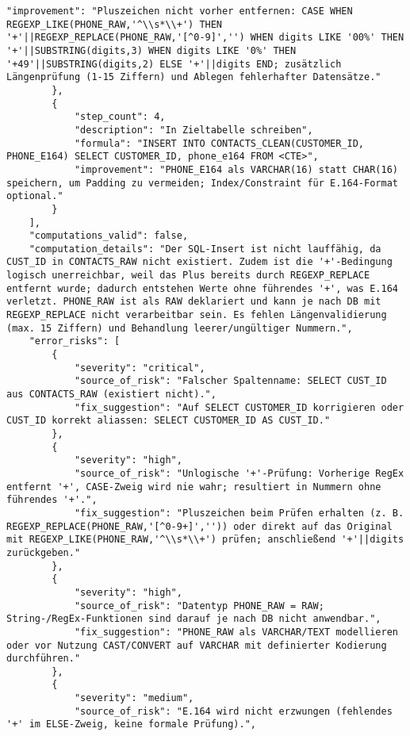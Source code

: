 \begin{lstlisting}[caption={Ausgabe: GPT-5 Anwendungsfall 3 Konsistenzdurchlauf},label={gpt_case3_prompt2}]
            "improvement": "Pluszeichen nicht vorher entfernen: CASE WHEN REGEXP_LIKE(PHONE_RAW,'^\\s*\\+') THEN '+'||REGEXP_REPLACE(PHONE_RAW,'[^0-9]','') WHEN digits LIKE '00%' THEN '+'||SUBSTRING(digits,3) WHEN digits LIKE '0%' THEN '+49'||SUBSTRING(digits,2) ELSE '+'||digits END; zusätzlich Längenprüfung (1-15 Ziffern) und Ablegen fehlerhafter Datensätze."
        },
        {
            "step_count": 4,
            "description": "In Zieltabelle schreiben",
            "formula": "INSERT INTO CONTACTS_CLEAN(CUSTOMER_ID, PHONE_E164) SELECT CUSTOMER_ID, phone_e164 FROM <CTE>",
            "improvement": "PHONE_E164 als VARCHAR(16) statt CHAR(16) speichern, um Padding zu vermeiden; Index/Constraint für E.164-Format optional."
        }
    ],
    "computations_valid": false,
    "computation_details": "Der SQL-Insert ist nicht lauffähig, da CUST_ID in CONTACTS_RAW nicht existiert. Zudem ist die '+'-Bedingung logisch unerreichbar, weil das Plus bereits durch REGEXP_REPLACE entfernt wurde; dadurch entstehen Werte ohne führendes '+', was E.164 verletzt. PHONE_RAW ist als RAW deklariert und kann je nach DB mit REGEXP_REPLACE nicht verarbeitbar sein. Es fehlen Längenvalidierung (max. 15 Ziffern) und Behandlung leerer/ungültiger Nummern.",
    "error_risks": [
        {
            "severity": "critical",
            "source_of_risk": "Falscher Spaltenname: SELECT CUST_ID aus CONTACTS_RAW (existiert nicht).",
            "fix_suggestion": "Auf SELECT CUSTOMER_ID korrigieren oder CUST_ID korrekt aliassen: SELECT CUSTOMER_ID AS CUST_ID."
        },
        {
            "severity": "high",
            "source_of_risk": "Unlogische '+'-Prüfung: Vorherige RegEx entfernt '+', CASE-Zweig wird nie wahr; resultiert in Nummern ohne führendes '+'.",
            "fix_suggestion": "Pluszeichen beim Prüfen erhalten (z. B. REGEXP_REPLACE(PHONE_RAW,'[^0-9+]','')) oder direkt auf das Original mit REGEXP_LIKE(PHONE_RAW,'^\\s*\\+') prüfen; anschließend '+'||digits zurückgeben."
        },
        {
            "severity": "high",
            "source_of_risk": "Datentyp PHONE_RAW = RAW; String-/RegEx-Funktionen sind darauf je nach DB nicht anwendbar.",
            "fix_suggestion": "PHONE_RAW als VARCHAR/TEXT modellieren oder vor Nutzung CAST/CONVERT auf VARCHAR mit definierter Kodierung durchführen."
        },
        {
            "severity": "medium",
            "source_of_risk": "E.164 wird nicht erzwungen (fehlendes '+' im ELSE-Zweig, keine formale Prüfung).",

\end{lstlisting}
